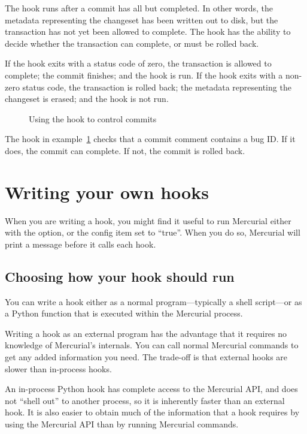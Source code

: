The  hook runs after a commit has all but
completed.  In other words, the metadata representing the changeset
has been written out to disk, but the transaction has not yet been
allowed to complete.  The  hook has the ability to
decide whether the transaction can complete, or must be rolled back.

If the  hook exits with a status code of zero, the
transaction is allowed to complete; the commit finishes; and the
 hook is run.  If the  hook exits with
a non-zero status code, the transaction is rolled back; the metadata
representing the changeset is erased; and the  hook is
not run.

\begin{figure}[ht]
  \caption{Using the  hook to control commits}
  \label{ex:hook:pretxncommit}
\end{figure}

The hook in example~\ref{ex:hook:pretxncommit} checks that a commit
comment contains a bug ID.  If it does, the commit can complete.  If
not, the commit is rolled back.

\section{Writing your own hooks}

When you are writing a hook, you might find it useful to run Mercurial
either with the  option, or the  config
item set to ``true''.  When you do so, Mercurial will print a message
before it calls each hook.

\subsection{Choosing how your hook should run}
\label{sec:hook:lang}

You can write a hook either as a normal program---typically a shell
script---or as a Python function that is executed within the Mercurial
process.

Writing a hook as an external program has the advantage that it
requires no knowledge of Mercurial's internals.  You can call normal
Mercurial commands to get any added information you need.  The
trade-off is that external hooks are slower than in-process hooks.

An in-process Python hook has complete access to the Mercurial API,
and does not ``shell out'' to another process, so it is inherently
faster than an external hook.  It is also easier to obtain much of the
information that a hook requires by using the Mercurial API than by
running Mercurial commands.

